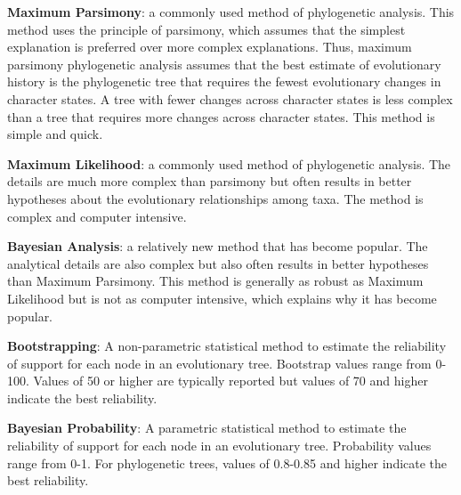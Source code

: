 \documentclass[letterpaper]{tufte-handout}
\begin{document}
\textbf{Maximum Parsimony}: a commonly used method of phylogenetic analysis.  This method uses the principle of parsimony, which assumes that the simplest explanation is preferred over more complex explanations.  Thus, maximum parsimony phylogenetic analysis assumes that the best estimate of evolutionary history is the phylogenetic tree that requires the fewest evolutionary changes in character states. A tree with fewer changes across character states is less complex than a tree that requires more changes across character states.  This method is simple and quick.

\textbf{Maximum Likelihood}: a commonly used method of phylogenetic analysis. The details are much more complex than parsimony but often results in better hypotheses about the evolutionary relationships among taxa. The method is complex and computer intensive. 

\textbf{Bayesian Analysis}: a relatively new method that has become popular. The analytical details are also complex but also often results in better hypotheses than Maximum Parsimony. This method is generally as robust as Maximum Likelihood but is not as computer intensive, which explains why it has become popular.

\textbf{Bootstrapping}: A non-parametric statistical method to estimate the reliability of support for each node in an evolutionary tree.  Bootstrap values range from 0-100. Values of 50 or higher are typically reported but values of 70 and higher indicate the best reliability. 

\textbf{Bayesian Probability}: A parametric statistical method to estimate the reliability of support for each node in an evolutionary tree.  Probability values range from 0-1. For phylogenetic trees, values of 0.8-0.85 and higher indicate the best reliability. 
\end{document}
